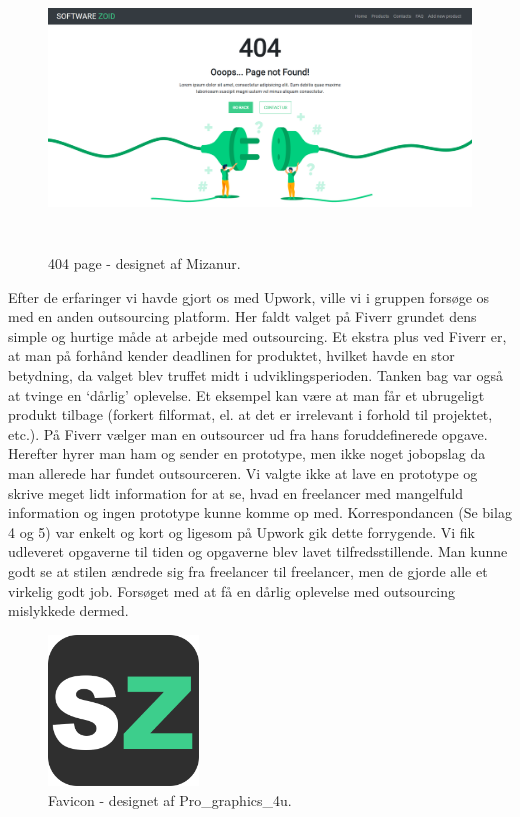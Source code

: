 \documentclass[11pt]{report}
\begin{document}
\begin{figure}[H]
  \centering
    \includegraphics[height=7.5cm, width=15cm]{404Page.png}
    \caption*{404 page - designet af Mizanur.}
\end{figure}

Efter de erfaringer vi havde gjort os med Upwork, ville vi i gruppen forsøge os med en anden outsourcing platform. Her faldt valget på Fiverr grundet dens simple og hurtige måde at arbejde med outsourcing. Et ekstra plus ved Fiverr er, at man på forhånd kender deadlinen for produktet, hvilket havde en stor betydning, da valget blev truffet midt i udviklingsperioden. Tanken bag var også at tvinge en ‘dårlig’ oplevelse. Et eksempel kan være at man får et ubrugeligt produkt tilbage (forkert filformat, el. at det er irrelevant i forhold til projektet, etc.).  
På Fiverr vælger man en outsourcer ud fra hans foruddefinerede opgave. Herefter hyrer man ham og sender en prototype, men ikke noget jobopslag da man allerede har fundet outsourceren. Vi valgte ikke at lave en prototype og skrive meget lidt information for at se, hvad en freelancer med mangelfuld information og ingen prototype kunne komme op med. Korrespondancen (Se bilag 4 og 5) var enkelt og kort og ligesom på Upwork gik dette forrygende. Vi fik udleveret opgaverne til tiden og opgaverne blev lavet tilfredsstillende. Man kunne godt se at stilen ændrede sig fra freelancer til freelancer, men de gjorde alle et virkelig godt job. Forsøget med at få en dårlig oplevelse med outsourcing mislykkede dermed.

\begin{figure}[H]
  \centering
    \includegraphics[height=4cm, width=4cm]{Favicon.png}
    \caption*{Favicon - designet af Pro\_graphics\_4u.}
\end{figure}
\end{document}
